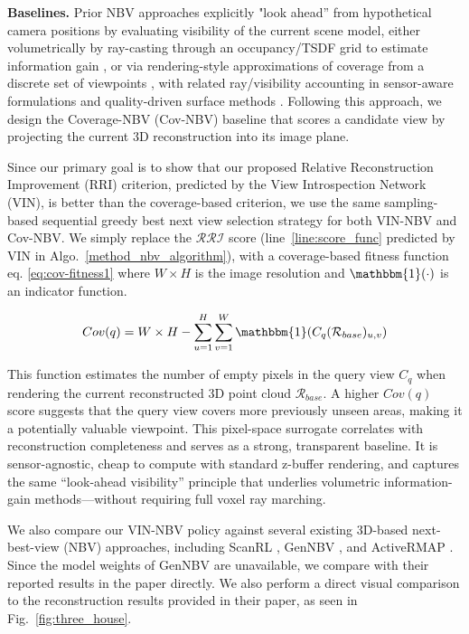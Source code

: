 \noindent\textbf{Baselines.} Prior NBV approaches explicitly "look ahead” from hypothetical camera positions by evaluating visibility of the current scene model, either volumetrically by ray-casting through an occupancy/TSDF grid to estimate information gain \cite{Islerinformationgainvolumetric3d, hardouinUAVNBV}, or via rendering-style approximations of coverage from a discrete set of viewpoints \cite{connollydetermination}, with related ray/visibility accounting in sensor-aware formulations \cite{pito1999solution} and quality-driven surface methods \cite{wuqualitydriven}. Following this approach, we design the Coverage-NBV (Cov-NBV) baseline that scores a candidate view by projecting the current 3D reconstruction into its image plane. 

Since our primary goal is to show that our proposed Relative Reconstruction Improvement (RRI) criterion, predicted by the View Introspection Network (VIN), is better than the coverage-based criterion, we use the same sampling-based sequential greedy best next view selection strategy for both VIN-NBV and Cov-NBV. We simply replace the $\mathcal{RRI}$ score (line~\ref{line:score_func} predicted by VIN in Algo.~\ref{method_nbv_algorithm}), with a coverage-based fitness function eq. \ref{eq:cov-fitness1} where $W\times H$ is the image resolution and $\mathbbm{1}(\cdot)$ is an indicator function.

\vspace{-1.0em}
\begin{equation}
Cov(q) =W\times H - \sum_{u=1}^{H} \sum_{v=1}^{W} \mathbbm{1}(C_q(\mathcal{R}_{base})_{u,v})
\label{eq:cov-fitness1}
\end{equation}
\vspace{-0.5em}

This function estimates the number of empty pixels in the query view $C_q$ when rendering the current reconstructed 3D point cloud $\mathcal{R}_{base}$. A higher $Cov(q)$ score suggests that the query view covers more previously unseen areas, making it a potentially valuable viewpoint.
This pixel-space surrogate correlates with reconstruction completeness and serves as a strong, transparent baseline. It is sensor-agnostic, cheap to compute with standard z-buffer rendering, and captures the same “look-ahead visibility” principle that underlies volumetric information-gain methods—without requiring full voxel ray marching.

We also compare our VIN-NBV policy against several existing 3D-based next-best-view (NBV) approaches, including ScanRL \cite{peralta2020next}, GenNBV \cite{chen2024gennbv}, and ActiveRMAP \cite{zhan2022activermapradiancefieldactive}. Since the model weights of GenNBV\cite{chen2024gennbv} are unavailable, we compare with their reported results in the paper directly. We also perform a direct visual comparison to the reconstruction results provided in their paper, as seen in Fig.~\ref{fig:three_house}.


